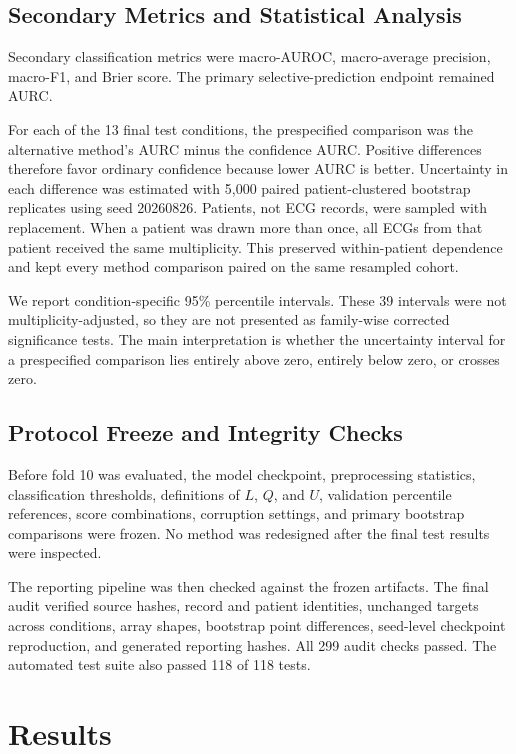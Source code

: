 \documentclass[journal]{IEEEtran}
\newcommand{\BootstrapReps}{5,000}
\begin{document}
\subsection{Secondary Metrics and Statistical Analysis}
Secondary classification metrics were macro-AUROC, macro-average precision, macro-F1, and Brier score. The primary selective-prediction endpoint remained AURC.

For each of the 13 final test conditions, the prespecified comparison was the alternative method's AURC minus the confidence AURC. Positive differences therefore favor ordinary confidence because lower AURC is better. Uncertainty in each difference was estimated with \BootstrapReps{} paired patient-clustered bootstrap replicates using seed 20260826. Patients, not ECG records, were sampled with replacement. When a patient was drawn more than once, all ECGs from that patient received the same multiplicity. This preserved within-patient dependence and kept every method comparison paired on the same resampled cohort.

We report condition-specific 95\% percentile intervals. These 39 intervals were not multiplicity-adjusted, so they are not presented as family-wise corrected significance tests. The main interpretation is whether the uncertainty interval for a prespecified comparison lies entirely above zero, entirely below zero, or crosses zero.

\subsection{Protocol Freeze and Integrity Checks}
Before fold 10 was evaluated, the model checkpoint, preprocessing statistics, classification thresholds, definitions of $L$, $Q$, and $U$, validation percentile references, score combinations, corruption settings, and primary bootstrap comparisons were frozen. No method was redesigned after the final test results were inspected.

The reporting pipeline was then checked against the frozen artifacts. The final audit verified source hashes, record and patient identities, unchanged targets across conditions, array shapes, bootstrap point differences, seed-level checkpoint reproduction, and generated reporting hashes. All 299 audit checks passed. The automated test suite also passed 118 of 118 tests.

\section{Results}
\end{document}
